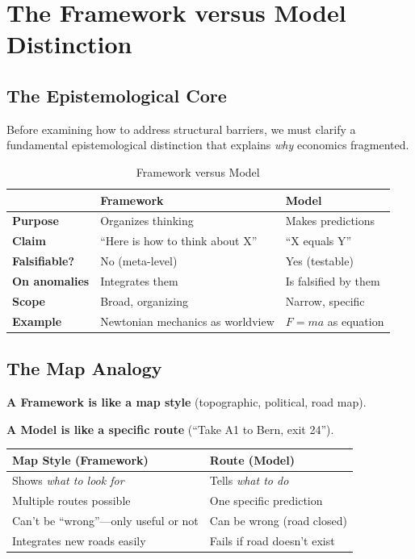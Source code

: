 \documentclass[12pt,a4paper]{article}
\begin{document}
\section{The Framework versus Model Distinction}
\label{sec:framework-model}

\subsection{The Epistemological Core}

Before examining how to address structural barriers, we must clarify a fundamental epistemological distinction that explains \emph{why} economics fragmented.

\begin{table}[H]
\centering
\caption{Framework versus Model}
\label{tab:framework-model}
\renewcommand{\arraystretch}{1.4}
\begin{tabular}{@{}p{3cm}p{5.5cm}p{5.5cm}@{}}
\toprule
& \textbf{Framework} & \textbf{Model} \\
\midrule
\textbf{Purpose} & Organizes thinking & Makes predictions \\
\textbf{Claim} & ``Here is how to think about X'' & ``X equals Y'' \\
\textbf{Falsifiable?} & No (meta-level) & Yes (testable) \\
\textbf{On anomalies} & Integrates them & Is falsified by them \\
\textbf{Scope} & Broad, organizing & Narrow, specific \\
\textbf{Example} & Newtonian mechanics as worldview & $F = ma$ as equation \\
\bottomrule
\end{tabular}
\end{table}

\subsection{The Map Analogy}

\textbf{A Framework is like a map style} (topographic, political, road map).

\textbf{A Model is like a specific route} (``Take A1 to Bern, exit 24'').

\begin{table}[H]
\centering
\renewcommand{\arraystretch}{1.3}
\begin{tabular}{@{}p{6cm}p{6cm}@{}}
\toprule
\textbf{Map Style (Framework)} & \textbf{Route (Model)} \\
\midrule
Shows \textit{what to look for} & Tells \textit{what to do} \\
Multiple routes possible & One specific prediction \\
Can't be ``wrong''---only useful or not & Can be wrong (road closed) \\
Integrates new roads easily & Fails if road doesn't exist \\
\bottomrule
\end{tabular}
\end{table}
\end{document}
